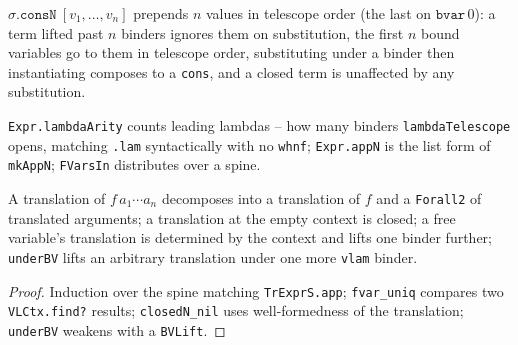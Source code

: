 \begin{definition}
\label{vpc:def:subst-consn}
\leanok
{}

 $\sigma.\mathtt{consN}\ [v_1,\dots,v_n]$ prepends $n$ values in telescope order
(the last on $\mathtt{bvar}\,0$): a term lifted past $n$ binders ignores them on substitution, the
first $n$ bound variables go to them in telescope order, substituting under a binder then
instantiating composes to a \texttt{cons}, and a closed term is unaffected by any substitution.
\end{definition}

\begin{definition}
\label{vpc:def:expr-spine}
\leanok
{}

 \texttt{Expr.lambdaArity} counts leading lambdas -- how many binders
\texttt{lambdaTelescope} opens, matching \texttt{.lam} syntactically with no \texttt{whnf};
\texttt{Expr.appN} is the list form of \texttt{mkAppN}; \texttt{FVarsIn} distributes over a
spine.
\end{definition}

\begin{lemma}
\label{vpc:thm:trexprs-appn-inv}
\leanok
{}

 A translation of $f\,a_1\cdots a_n$ decomposes into a translation of $f$ and a
\texttt{Forall2} of translated arguments; a translation at the empty context is closed; a free
variable's translation is determined by the context and lifts one binder further;
\texttt{underBV} lifts an arbitrary translation under one more \texttt{vlam} binder.
\end{lemma}
\begin{proof}\leanok
{} Induction over the spine matching \texttt{TrExprS.app}; \texttt{fvar\_uniq} compares
two \texttt{VLCtx.find?} results; \texttt{closedN\_nil} uses well-formedness of the translation;
\texttt{underBV} weakens with a \texttt{BVLift}.
\end{proof}

